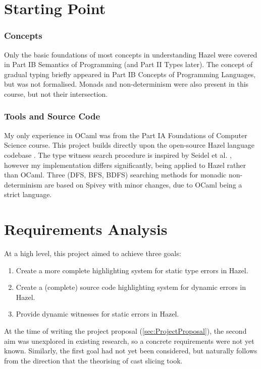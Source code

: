 \section{Starting Point}\label{sec:StartingPoint}
\subsubsection{Concepts}
Only the basic foundations of most concepts in understanding Hazel were covered in Part IB Semantics of Programming (and Part II Types later). The concept of gradual typing briefly appeared in Part IB Concepts of Programming Languages, but was not formalised. Monads and non-determinism were also present in this course, but not their intersection.

\subsubsection{Tools and Source Code}
My only experience in OCaml was from the Part IA Foundations of Computer Science course. This project builds directly upon the open-source Hazel language codebase \cite{HazelCode}. The type witness search procedure is inspired by Seidel et al. \cite{SearchProc}, however my implementation differs significantly, being applied to Hazel rather than OCaml. Three (DFS, BFS, BDFS) searching methods for monadic non-determinism are based on Spivey \cite{Bunches} with minor changes, due to OCaml being a strict language.

\section{Requirements Analysis}\label{sec:RequirementAnalysis}
At a high level, this project aimed to achieve three goals:
\begin{enumerate}
\item Create a more complete highlighting system for static type errors in Hazel.
\item Create a (complete) source code highlighting system for dynamic errors in Hazel.
\item Provide dynamic witnesses for static errors in Hazel. 
\end{enumerate}
At the time of writing the project proposal (\cref{sec:ProjectProposal}), the second aim was unexplored in existing research, so a concrete requirements were not yet known. Similarly, the first goal had not yet been considered, but naturally follows from the direction that the theorising of cast slicing took.

